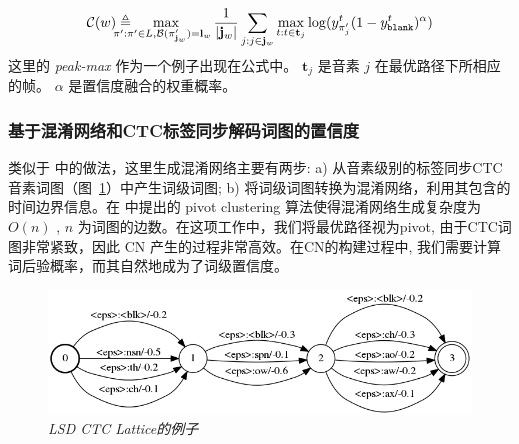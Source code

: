      \begin{equation}\label{eq:psd-ac-conf2}
        \mathcal{C}(w)
        \triangleq
        \!\!\!\!\!\!\mathop{\max}\limits
       _{\!\!\!\!\pi':\pi' \in L, \mathcal{B}(\pi'_{\mathbf{j}_w})       =       {\mathbf{l}}_w}
   \frac{1}{|\mathbf{j}_w|}\sum_{j:j\in \mathbf{j}_w}
   \max_{t:t\in\mathbf{t}_j}
   {\log(y^{t}_{\pi'_{j}}(1-y^{t}_{\tt{blank}})^\alpha)}
     \end{equation}
这里的 {\em peak-max} 作为一个例子出现在公式中。 $\mathbf{t}_j$ 是音素 $j$ 在最优路径下所相应的帧。 $\alpha$ 是置信度融合的权重概率。


\subsubsection{基于混淆网络和CTC标签同步解码词图的置信度}
\label{sec:psd-cn-conf}

类似于 \cite{evermann2000large}中的做法，这里生成混淆网络主要有两步: a) 从音素级别的标签同步CTC音素词图（图~\ref{fig:ctc-lat-exp}）中产生词级词图; b) 将词级词图转换为混淆网络，利用其包含的时间边界信息。在 \cite{hakkani2006beyond}中提出的 pivot clustering 算法使得混淆网络生成复杂度为 $O(n)$ , $n$ 为词图的边数。在这项工作中，我们将最优路径视为pivot, 由于CTC词图非常紧致，因此  CN 产生的过程非常高效。在CN的构建过程中, 我们需要计算词后验概率，而其自然地成为了词级置信度。



\begin{figure}[tbhp!]
        \centering
        \includegraphics[width=0.95\linewidth]{figure/ctc_lat.png}
        \caption{{\it  LSD CTC Lattice的例子}}
        \label{fig:ctc-lat-exp}
      \end{figure}

